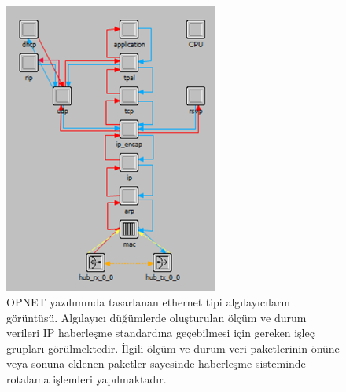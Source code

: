 \begin{figure}[htbp]


\centerline{\includegraphics[width=7cm]{Resim/Sekil4-9.png}}
\caption{OPNET yazılımında tasarlanan ethernet tipi algılayıcıların görüntüsü. Algılayıcı düğümlerde oluşturulan ölçüm ve durum verileri IP haberleşme standardına geçebilmesi için gereken işleç grupları görülmektedir. İlgili ölçüm ve durum veri paketlerinin önüne veya sonuna eklenen paketler sayesinde haberleşme sisteminde rotalama işlemleri yapılmaktadır.}
\label{fig:4-9}
\end{figure}

